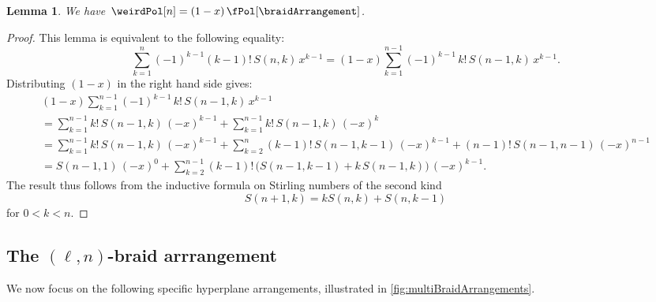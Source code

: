 \documentclass{amsart}
\newtheorem{lemma}[theorem]{Lemma}
\theoremstyle{definition}
\begin{document}
\begin{lemma}
We have~$\weirdPol[n] = (1-x) \, \fPol[\braidArrangement]$.
\end{lemma}

\begin{proof}
This lemma is equivalent to the following equality:
\begin{equation*}
\sum_{k=1}^n (-1)^{k-1} (k-1)! \, S(n,k) \, x^{k-1} = (1-x) \sum_{k=1}^{n-1} (-1)^{k-1} \, k! \, S(n-1,k) \, x^{k-1}.
\end{equation*}
Distributing $(1-x)$ in the right hand side gives:
\begin{gather*}
(1-x) \sum_{k=1}^{n-1} (-1)^{k-1} \, k! \, S(n-1,k) \, x^{k-1} \\
= \sum_{k=1}^{n-1} k! \, S(n-1,k) \, (-x)^{k-1} + \sum_{k=1}^{n-1} k! \, S(n-1,k) \, (-x)^{k} \\
= \sum_{k=1}^{n-1} k! \, S(n-1,k) \, (-x)^{k-1} + \sum_{k=2}^{n} (k-1)! \, S(n-1,k-1) \, (-x)^{k-1} + (n-1)! \, S(n-1, n-1) \, (-x)^{n-1} \\
= S(n-1,1) \, (-x)^0 + \sum_{k=2}^{n-1} (k-1)! \, \big( S(n-1,k-1) + k \, S(n-1,k) \big) \, (-x)^{k-1}.
\end{gather*}
The result thus follows from the inductive formula on Stirling numbers of the second kind
\[
S(n+1,k) = k S(n,k) + S(n,k-1)
\]
for $0<k<n$.
\end{proof}


\subsection{The $(\ell,n)$-braid arrrangement}
\label{subsec:multiBraidArrangement}

We now focus on the following specific hyperplane arrangements, illustrated in \cref{fig:multiBraidArrangements}.
\end{document}

